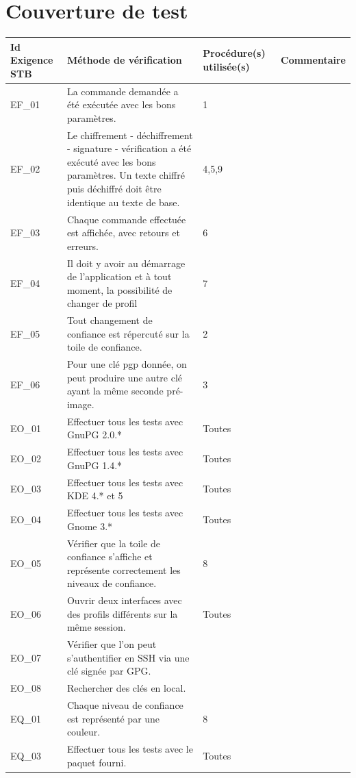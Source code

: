 \documentclass{../res/univ-projet}
\begin{document}
\section{Couverture de test}

\begin{center}
    \begin{tabular}{|p{2.8cm}|p{4.2cm}|p{3cm}|p{5cm}|}
      \hline
      Id Exigence STB & Méthode de vérification & Procédure(s) utilisée(s) & Commentaire\\ \hline
      EF\_01 & La commande demandée a été exécutée avec les bons paramètres. & 1 & \\ \hline
      EF\_02 & Le chiffrement - déchiffrement - signature - vérification a été exécuté avec les bons paramètres. Un texte chiffré puis déchiffré doit être identique au texte de base. & 4,5,9 & \\ \hline
      EF\_03 & Chaque commande effectuée est affichée, avec retours et erreurs. & 6 & \\ \hline
      EF\_04 & Il doit y avoir au démarrage de l'application et à tout moment, la possibilité de changer de profil & 7 & \\ \hline
      EF\_05 & Tout changement de confiance est répercuté sur la toile de confiance. & 2 & \\ \hline
      EF\_06 & Pour une clé pgp donnée, on peut produire une autre clé ayant la même seconde pré-image. & 3 & \\ \hline
      EO\_01 & Effectuer tous les tests avec GnuPG 2.0.* & Toutes & \\ \hline
      EO\_02 & Effectuer tous les tests avec GnuPG 1.4.* & Toutes & \\ \hline
      EO\_03 & Effectuer tous les tests avec KDE 4.* et 5 & Toutes & \\ \hline
      EO\_04 & Effectuer tous les tests avec Gnome 3.* & Toutes & \\ \hline
      EO\_05 & Vérifier que la toile de confiance s'affiche et représente correctement les niveaux de confiance. & 8 & \\ \hline
      EO\_06 & Ouvrir deux interfaces avec des profils différents sur la même session. & Toutes & \\ \hline
      EO\_07 & Vérifier que l'on peut s'authentifier en SSH via une clé signée par GPG. &  & \\ \hline
      EO\_08 & Rechercher des clés en local. &  & \\ \hline
      EQ\_01 & Chaque niveau de confiance est représenté par une couleur. & 8 & \\ \hline
      EQ\_03 & Effectuer tous les tests avec le paquet fourni. & Toutes & \\ \hline
  \end{tabular}  
\end{center}
\end{document}
